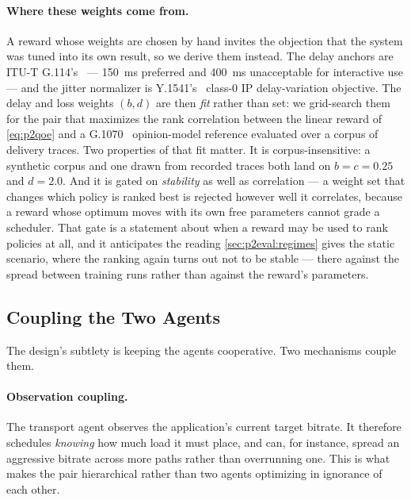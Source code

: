 \paragraph{Where these weights come from.} A reward whose weights are chosen by hand invites the
objection that the system was tuned into its own result, so we derive them instead. The delay anchors
are ITU-T G.114's~\cite{ITUG114} --- \SI{150}{\milli\second} preferred and \SI{400}{\milli\second}
unacceptable for interactive use --- and the jitter normalizer is Y.1541's~\cite{ITUY1541} class-0 IP
delay-variation objective. The delay and loss weights $(b, d)$ are then \emph{fit} rather than set: we
grid-search them for the pair that maximizes the rank correlation between the linear reward of
\cref{eq:p2qoe} and a G.1070~\cite{ITUG1070} opinion-model reference evaluated over a corpus of
delivery traces. Two properties of that fit matter. It is corpus-insensitive: a synthetic corpus and
one drawn from recorded traces both land on $b = c = 0.25$ and $d = 2.0$. And it is gated on
\emph{stability} as well as correlation --- a weight set that changes which policy is ranked best is
rejected however well it correlates, because a reward whose optimum moves with its own free parameters
cannot grade a scheduler. That gate is a statement about when a reward may be used to rank policies at
all, and it anticipates the reading \cref{sec:p2eval:regimes} gives the static scenario, where the
ranking again turns out not to be stable --- there against the spread between training runs rather than
against the reward's parameters.

\subsection{Coupling the Two Agents}
\label{sec:p2design:coupling}

The design's subtlety is keeping the agents cooperative. Two mechanisms couple them.

\paragraph{Observation coupling.} The transport agent observes the application's current target bitrate.
It therefore schedules \emph{knowing} how much load it must place, and can, for instance, spread an
aggressive bitrate across more paths rather than overrunning one. This is what makes the pair hierarchical
rather than two agents optimizing in ignorance of each other.

